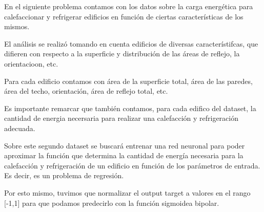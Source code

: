 En el siguiente problema contamos con los datos sobre la carga energética para calefaccionar y refrigerar edificios en función de ciertas características de los mismos.

El análisis se realizó tomando en cuenta edificios de diversas característifcas, que difieren con respecto a la superficie y distribución de las áreas de reflejo, la orientacioon, etc.

Para cada edificio contamos con área de la superficie total, área de las paredes, área del techo, orientación, área de reflejo total, etc.

Es importante remarcar que también contamos, para cada edifico del dataset, la cantidad de energia necersaria para realizar una calefacción y refrigeración adecuada.

Sobre este segundo dataset se buscará entrenar una red neuronal para poder aproximar la función que determina la cantidad de energía necesaria para la calefacción y refrigeración de un edificio en función de los parámetros de entrada. Es decir, es un problema de regresión.

Por esto mismo, tuvimos que normalizar el output target a valores en el rango [-1,1] para que podamos predecirlo con la función sigmoidea bipolar.
